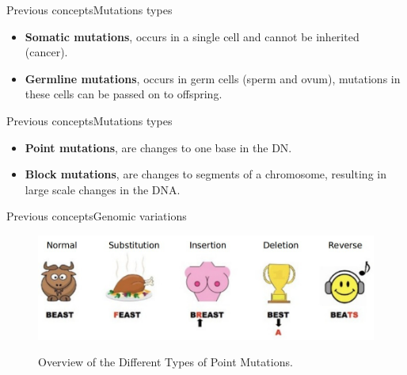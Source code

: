 \documentclass[10pt]{beamer}
\begin{document}
{%
\begin{frame}{Previous concepts}{Mutations types}
	\begin{block}{}
		\begin{itemize}
			\item \textbf{Somatic mutations}, occurs in a single cell and cannot be inherited (cancer).
			\item \textbf{Germline mutations}, occurs in germ cells (sperm and ovum), mutations in these cells can be passed on to offspring.
		\end{itemize}	
	\end{block}
\end{frame}

\begin{frame}{Previous concepts}{Mutations types}
	\begin{block}{}
		\begin{itemize}
			\item \textbf{Point mutations}, are changes to one base in the DN.
			\item \textbf{Block mutations}, are changes to segments of a chromosome, resulting in large scale changes in the DNA.
		\end{itemize}	
	\end{block}
\end{frame}

\begin{frame}{Previous concepts}{Genomic variations}
	\begin{figure}[]
		\centering
		\includegraphics[width=\textwidth,height=0.7\textheight,keepaspectratio]{img/alignment/point_mutations_med.jpg}
		\label{img:alig}
		\caption{Overview of the Different Types of Point Mutations.}
	\end{figure}
\end{frame}

}
\end{document}
